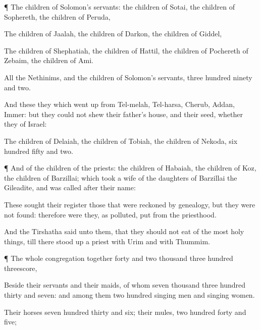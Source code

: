 {\par }{\PP {}¶ The
children of
Solomon’s
servants: the
children of
Sotai, the
children of
Sophereth, the
children of
Peruda,

The
children of
Jaalah, the
children of
Darkon, the
children of
Giddel,

The
children of
Shephatiah, the
children of
Hattil, the
children of Pochereth of
Zebaim, the
children of
Ami.

All the
Nethinims, and the
children of
Solomon’s
servants,
{}
three
hundred
ninety and
two.

And these
{} they which went
up from
Tel-melah,
Tel-harsa,
Cherub,
Addan,
{}
Immer: but they
could not
shew their
father’s
house, and their
seed, whether they
{} of
Israel:

The
children of
Delaiah, the
children of
Tobiah, the
children of
Nekoda,
six
hundred
fifty and
two.


\par }{\PP {}¶ And of the
children of the
priests: the
children of
Habaiah, the
children of
Koz, the
children of
Barzillai; which
took a
wife of the
daughters of
Barzillai the
Gileadite, and was
called after their
name:

These
sought their
register
{} those that were reckoned by
genealogy, but they were not
found: therefore were they, as
polluted, put from the
priesthood.

And the
Tirshatha
said unto them, that they should not
eat of the
most holy
things, till there stood
up a
priest with
Urim and with
Thummim.


\par }{\PP {}¶ The whole
congregation
together
{}
forty and two
thousand
three
hundred
{}
threescore,

Beside their
servants and their
maids, of whom
{}
seven
thousand
three
hundred
thirty and
seven: and
{} among them two
hundred singing
men and singing
women.

Their
horses
{}
seven
hundred
thirty and
six; their
mules, two
hundred
forty and
five;

}
